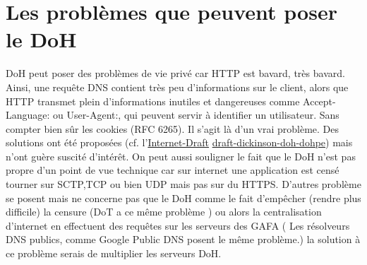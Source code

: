 \documentclass[a4paper,12pt]{article}
\begin{document}
	\section{Les problèmes que peuvent poser le DoH}	
	DoH peut poser des problèmes de vie privé car HTTP est bavard, très bavard. Ainsi, une requête DNS contient très peu d'informations sur le client, alors que HTTP transmet plein d'informations inutiles et dangereuses comme Accept-Language: ou User-Agent:, qui peuvent servir à identifier un utilisateur. Sans compter bien sûr les cookies (RFC 6265). Il s'agit là d'un vrai problème. Des solutions ont été proposées (cf. l'\href{https://en.wikipedia.org/wiki/Internet_Draft}{Internet-Draft} \href{https://datatracker.ietf.org/doc/draft-dickinson-doh-dohpe/}{draft-dickinson-doh-dohpe}) mais n'ont guère suscité d'intérêt.
	On peut aussi souligner le fait que le DoH n'est pas propre d'un point de vue technique car sur internet une application est censé tourner sur SCTP,TCP ou bien UDP mais pas sur du HTTPS.
	D'autres problème se posent mais ne concerne pas que le DoH comme le fait d'empêcher (rendre plus difficile) la censure (DoT a ce même problème ) ou alors la centralisation d'internet en effectuent des requêtes sur les serveurs des GAFA
    ( Les résolveurs DNS publics, comme Google Public DNS posent le même problème.) la solution à ce problème serais de multiplier les serveurs DoH.
\end{document}
